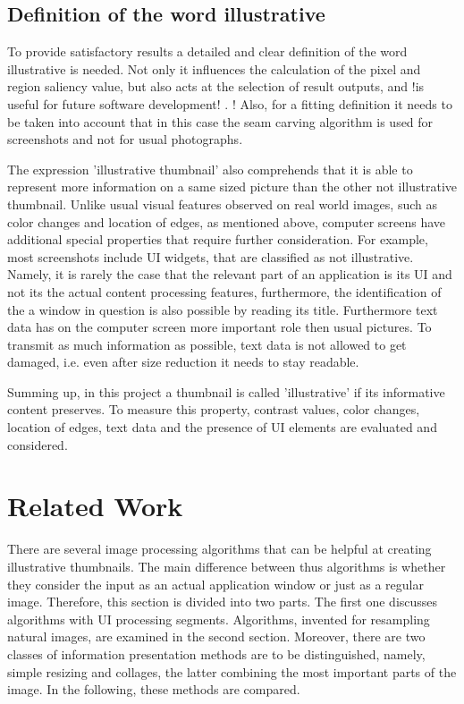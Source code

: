 \documentclass[draft,final]{vutinfth} %
\begin{document}
	\section{Definition of the word illustrative} 
	To provide satisfactory results a detailed and clear definition of the word illustrative is needed.
	Not only it influences the calculation of the pixel and region saliency value, but also acts at the selection of result outputs, and !is useful for future software development! .
	! Also, for a fitting definition it needs to be taken into account that in this case the seam carving algorithm is used for screenshots and not for usual photographs.\par 
	The expression 'illustrative thumbnail' also comprehends that it is able to represent more information on a same sized picture than the other not illustrative thumbnail.
	Unlike usual visual features observed on real world images, such as color changes and location of edges, as mentioned above, computer screens have additional special properties that require further consideration.
	For example, most screenshots include UI widgets, that are classified as not illustrative.
	Namely, it is rarely the case that the relevant part of an application is its UI and not its the actual content processing features, furthermore, the identification of the a window in question is also possible by reading its title.
	Furthermore text data has on the computer screen more important role then usual pictures.
	To transmit as much information as possible, text data is not allowed to get damaged, i.e. even after size reduction it needs to stay readable.\par 
	Summing up, in this project a thumbnail is called 'illustrative' if its informative content preserves.
	To measure this property, contrast values, color changes, location of edges, text data and the presence of UI elements are evaluated and considered.            
	
	\chapter{Related Work}
	There are several image processing algorithms that can be helpful at creating illustrative thumbnails.
	The main difference between thus algorithms is whether they consider the input as an actual application window or just as a regular image.
	Therefore, this section is divided into two parts.
	The first one discusses algorithms with UI processing segments.
	Algorithms, invented for resampling natural images, are examined in the second section. 
	Moreover, there are two classes of information presentation methods are to be distinguished, namely, simple resizing and collages, the latter combining the most important parts of the image. 
	In the following, these methods are compared.
	
\end{document}

